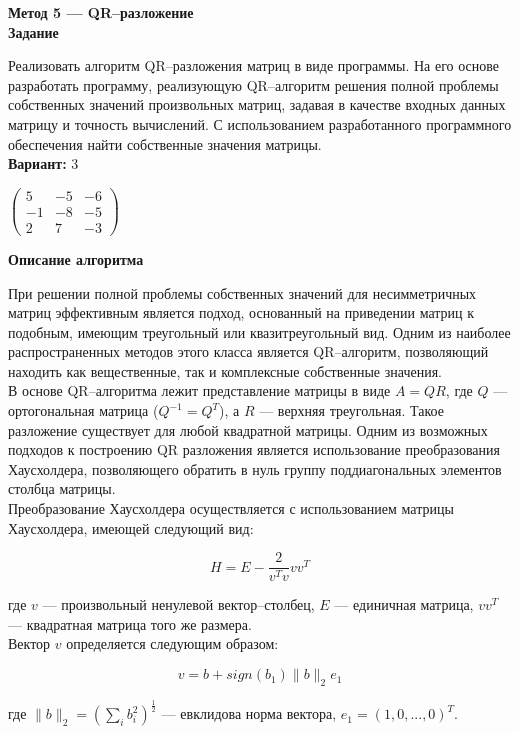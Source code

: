\textbf{Метод 5 --- QR--разложение}\\

\textbf{Задание}

Реализовать алгоритм QR--разложения матриц в виде программы. На его основе разработать программу, реализующую QR--алгоритм решения полной проблемы собственных значений произвольных матриц, задавая в качестве входных данных матрицу и точность вычислений. С использованием разработанного программного обеспечения найти собственные значения матрицы.\\

\textbf{Вариант:} 3

$
\begin{pmatrix}
5 & -5 & -6\\
-1 & -8 & -5\\
2 & 7 & -3
\end{pmatrix}
$
\vspace{0.5cm}

\textbf{Описание алгоритма}

При решении полной проблемы собственных значений для несимметричных матриц эффективным является подход, основанный на приведении матриц к подобным, имеющим треугольный или квазитреугольный вид. Одним из наиболее распространенных методов этого класса является QR--алгоритм, позволяющий находить как вещественные, так и комплексные собственные значения.\\

В основе QR--алгоритма лежит представление матрицы в виде $A=QR$, где $Q$ --- ортогональная матрица ($Q^{-1}=Q^T$), а $R$ --- верхняя треугольная. Такое разложение существует для любой квадратной матрицы. Одним из возможных подходов к построению QR разложения является использование преобразования Хаусхолдера, позволяющего обратить в нуль группу поддиагональных элементов столбца матрицы.\\

Преобразование Хаусхолдера осуществляется с использованием матрицы Хаусхолдера, имеющей следующий вид:

$$
H=E-\frac{2}{v^Tv}vv^T
$$

где $v$ --- произвольный ненулевой вектор--столбец, $E$ --- единичная матрица, $vv^T$ --- квадратная матрица того же размера.\\

Вектор $v$ определяется следующим образом:

$$
v=b+sign(b_1)\|b\|_2e_1
$$

где $\|b\|_2=(\sum\limits_ib_i^2)^\frac{1}{2}$ --- евклидова норма вектора, $e_1=(1,0,...,0)^T$.\\


